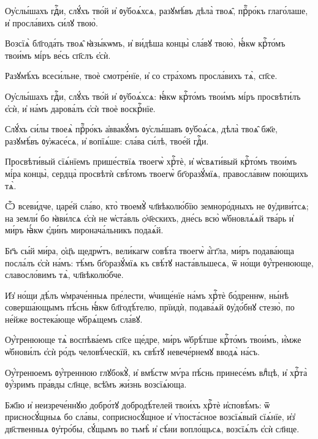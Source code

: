 \hKv Оу҆слы́шахъ гдⷭ҇и, слꙋ́хъ тво́й и҆ ᲂу҆боѧ́хсѧ, разꙋмѣ́въ  дѣла̀ твоѧ̑, прⷪ҇ро́къ глаго́лаше, и҆ просла́вихъ си́лꙋ твою̀. 

\hKv Возсїѧ̀ бл҃года́ть твоѧ̑ ꙗ҆зы́кѡмъ, и҆ ви́дѣша концы̀ сла́вꙋ  твою̀, ꙗ҆́кѡ крⷭ҇то́мъ твои́мъ мі́ръ ве́сь сп҃слъ є҆сѝ. 

\hKv Разꙋмѣ́хъ всеси́льне, твоѐ смотре́нїе, и҆ со стра́хомъ  просла́вихъ тѧ̀, сп҃се. 

\hKv Оу҆слы́шахъ гдⷭ҇и, слꙋ́хъ тво́й и҆ ᲂу҆боѧ́хсѧ: ꙗ҆́кѡ крⷭ҇то́мъ  твои́мъ мі́ръ просвѣти́лъ є҆сѝ, и҆ на́мъ дарова́лъ є҆сѝ твоѐ  воскрⷭ҇нїе. 

\hKv Слꙋ́хъ си́лы твоеѧ̀ прⷪ҇ро́къ а҆ввакꙋ́мъ ᲂу҆слы́шавъ  ᲂу҆боѧ́сѧ, дѣла̀ твоѧ̑ бж҃е, разꙋмѣ́въ ᲂу҆жасе́сѧ, и҆ вопїѧ́ше:  сла́ва си́лѣ, твое́й гдⷭ҇и. 
%

\hKv Просвѣти́вый сїѧ́нїемъ прише́ствїѧ твоегѡ̀ хрⷭ҇тѐ, и҆  ѡ҆свѧти́вый крⷭ҇то́мъ твои́мъ мі́ра концы̀, сердца̀ просвѣтѝ  свѣ́томъ твоегѡ̀ бг҃оразꙋ́мїѧ, правосла́внѡ пою́щихъ тѧ̀.  

\hKv Ѽ всеви́дче, царе́й сла́во, кто̀ твоемꙋ̀ чл҃вѣколю́бїю  земноро́дныхъ не ᲂу҆диви́тсѧ; на земли́ бо ꙗ҆ви́лсѧ є҆сѝ не  ѡ҆ста́вль ѻ҆ч҃ескихъ, дне́сь всю̀ ѡ҆бновлѧ́ѧй тва́рь и҆ ми́ръ ꙗ҆́кѡ  є҆ди́нъ миронача́льникъ подаѧ́й. 
%

\hKv Бг҃ъ сы́й ми́ра, ѻ҆ц҃ъ щедрѡ́тъ,  вели́кагѡ совѣ́та твоегѡ̀ а҆́гг҃ла, ми́ръ подава́юща посла́лъ є҆сѝ  на́мъ: тѣ́мъ бг҃оразꙋ́мїѧ къ свѣ́тꙋ наста́вльшесѧ, ѿ но́щи  ᲂу҆́тренююще, славосло́вимъ тѧ̀, чл҃вѣколю́бче. 

\hKv И҆з̾ но́щи дѣ́лъ ѡ҆мраче́нныѧ пре́лести, ѡ҆чище́нїе на́мъ  хрⷭ҇тѐ бо́дреннѡ, ны́нѣ соверша́ющымъ пѣ́снь ꙗ҆́кѡ бл҃годѣ́телю,  прїидѝ, подава́ѧй ᲂу҆до́бнꙋ стезю̀, по не́йже востека́юще  ѡ҆брѧ́щемъ сла́вꙋ. 
%

\hKv Оу҆́тренююще тѧ̀ воспѣва́емъ сп҃се ще́дре,  ми́ръ ѡ҆брѣ́тше крⷭ҇то́мъ твои́мъ, и҆́мже ѡ҆бнови́лъ є҆сѝ ро́дъ  человѣ́ческїй, къ свѣ́тꙋ невече́рнемꙋ вводѧ̀ на́съ.  
%

\hKv Оу҆́тренюемъ ᲂу҆́треннюю глꙋбокꙋ̀, и҆ вмѣ́стѡ мѵ́ра  пѣ́снь принесе́мъ влⷣцѣ, и҆ хрⷭ҇та̀ ᲂу҆́зримъ пра́вды сл҃нце,  всѣ̑мъ жи́знь возсїѧ́юща. 
%

\hKv Бж҃їю и҆ неизрече́ннꙋю добро́тꙋ  добродѣ́телей твои́хъ хрⷭ҇тѐ и҆сповѣ́мъ: ѿ присносꙋ́щныѧ бо  сла́вы, соприсносꙋ́щное и҆ ѵ҆поста́сное возсїѧ́вый сїѧ́нїе, и҆з̾  дв҃ственныѧ ᲂу҆тро́бы, сꙋ́щымъ во тьмѣ̀ и҆ сѣ́ни вопло́щьсѧ,  возсїѧ́лъ є҆сѝ сл҃нце. 
%

